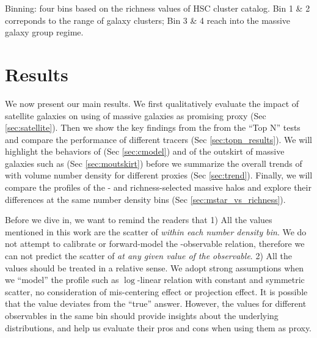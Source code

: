 \documentclass[a4paper,fleqn,usenatbib]{mnras}
\begin{document}
Binning:  four bins based on the richness values of HSC \redm{} cluster
            catalog. Bin 1 \& 2 correponds to the \mvir{} range of galaxy clusters;
            Bin 3 \& 4 reach into the massive galaxy group regime.
            
            


\section{Results}
    \label{sec:result}

    We now present our main results. We first qualitatively evaluate the impact of satellite galaxies on using \mstar{} of massive
    galaxies as promising \mvir{} proxy (Sec \ref{sec:satellite}).
    Then we show the key findings from the from the ``Top N'' tests and compare the performance
    of different \mvir{} tracers (Sec \ref{sec:topn_results}).
    We will highlight the behaviors of \mcmodel{} (Sec \ref{sec:cmodel}) and \mstar{}
    of the outskirt of massive galaxies such as  (Sec \ref{sec:moutskirt})
    before we summarize the overall trends of \sighalo{} with volume number density for different
    \mvir{} proxies (Sec \ref{sec:trend}).
    Finally, we will compare the \dsigma{} profiles of the \mstar{}- and richness-selected
    massive halos and explore their differences at the same number density bins
    (Sec \ref{sec:mstar_vs_richness}).

    Before we dive in, we want to remind the readers that
    1) All the \sighalo{} values mentioned in this work are the scatter of \mvir{} \emph{within each
    number density bin}. We do not attempt to calibrate or forward-model the \mvir{}-observable
    relation, therefore we can not predict the scatter of \mvir{} \emph{at any given value of
    the observable}.
    2) All the \sighalo{} values should be treated in a relative sense. We adopt strong
    assumptions when we ``model'' the \dsigma{} profile such as $\log$-linear relation with
    constant and symmetric scatter, no consideration of mis-centering effect or projection effect.
    It is possible that the \sighalo{} value deviates from the ``true'' answer.
    However, the \sighalo{} values for different observables in the same bin should provide
    insights about the underlying \mvir{} distributions, and help us evaluate their pros and cons
    when using them as \mvir{} proxy.
\end{document}
